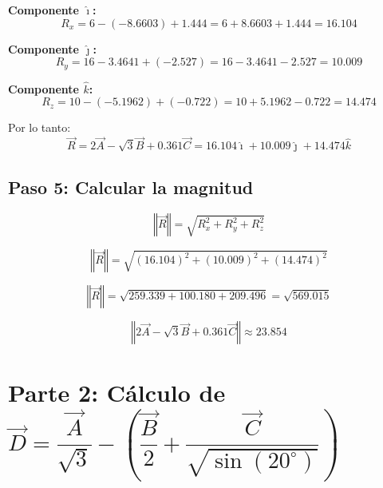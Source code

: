\documentclass[12pt,letterpaper]{article}
\begin{document}
\textbf{Componente $\hat{\imath}$:}
\begin{equation*}
R_x = 6 - (-8.6603) + 1.444 = 6 + 8.6603 + 1.444 = \mathbf{16.104}
\end{equation*}

\textbf{Componente $\hat{\jmath}$:}
\begin{equation*}
R_y = 16 - 3.4641 + (-2.527) = 16 - 3.4641 - 2.527 = \mathbf{10.009}
\end{equation*}

\textbf{Componente $\hat{k}$:}
\begin{equation*}
R_z = 10 - (-5.1962) + (-0.722) = 10 + 5.1962 - 0.722 = \mathbf{14.474}
\end{equation*}

Por lo tanto:
\begin{equation*}
\vec{R} = 2\vec{A}-\sqrt{3}\vec{B}+0.361\vec{C} = 16.104\hat{\imath}+10.009\hat{\jmath}+14.474\hat{k}
\end{equation*}

\subsection*{Paso 5: Calcular la magnitud}

\begin{equation*}
\left\Vert \vec{R} \right\Vert = \sqrt{R_x^2 + R_y^2 + R_z^2}
\end{equation*}

\begin{equation*}
\left\Vert \vec{R} \right\Vert = \sqrt{(16.104)^2 + (10.009)^2 + (14.474)^2}
\end{equation*}

\begin{equation*}
\left\Vert \vec{R} \right\Vert = \sqrt{259.339 + 100.180 + 209.496} = \sqrt{569.015}
\end{equation*}

\begin{equation*}
\boxed{\left\Vert 2\vec{A}-\sqrt{3}\vec{B}+0.361\vec{C}\right\Vert \approx 23.854}
\end{equation*}

\section*{Parte 2: C\'alculo de $\vec{D} = \dfrac{\vec{A}}{\sqrt{3}}-\left( \dfrac{\vec{B}}{2}+\dfrac{\vec{C}}{\sqrt{\sin(20^\circ)}}\right)$}
\end{document}
